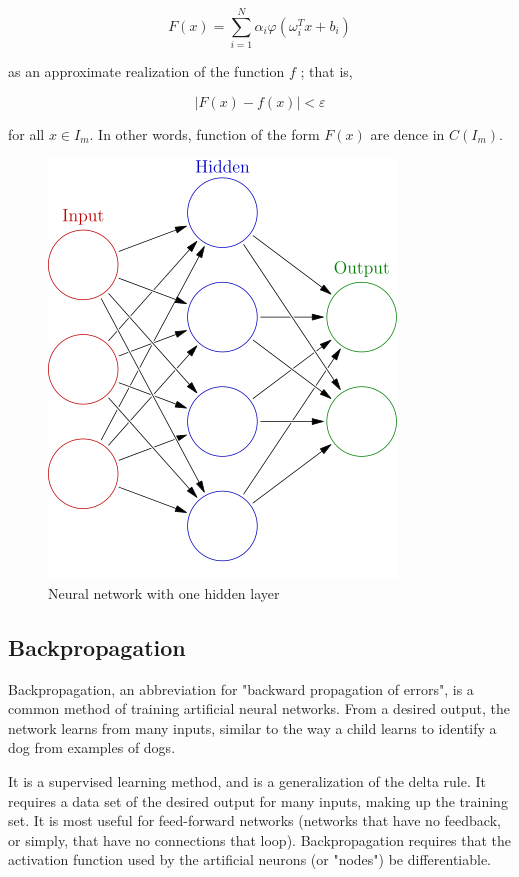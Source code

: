 \documentclass[a4paper,12pt]{article}
\begin{document}
\begin{equation}
 F(x) = \sum\limits_{i=1}^N\alpha_i\varphi(\omega_i^Tx+b_i) 
\end{equation}

as an approximate realization of the function $ f $ ; that is,

\begin{equation}
 |F(x)-f(x)|<\varepsilon
\end{equation}

for all $ x \in I_m$. In other words, function of the form $ F(x) $ are dence in $ C(I_m) $.   
\begin{figure}[ht]
 \centering
 \includegraphics[scale=0.4]{images/neurons.png}
 \caption{Neural network with one hidden layer}
\end{figure}

\subsection{Backpropagation}

Backpropagation, an abbreviation for "backward propagation of errors", is a common method of training artificial neural networks. From a desired output, the network learns from many inputs, similar to the way a child learns to identify a dog from examples of dogs.

It is a supervised learning method, and is a generalization of the delta rule. It requires a data set of the desired output for many inputs, making up the training set. It is most useful for feed-forward networks (networks that have no feedback, or simply, that have no connections that loop). Backpropagation requires that the activation function used by the artificial neurons (or "nodes") be differentiable.
\end{document}
